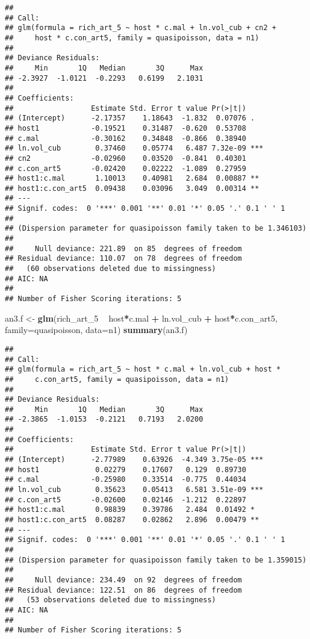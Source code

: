 \documentclass[]{article}
\newenvironment{Shaded}{\begin{snugshade}}{\end{snugshade}}
\newcommand{\KeywordTok}[1]{\textcolor[rgb]{0.13,0.29,0.53}{\textbf{#1}}}
\newcommand{\DataTypeTok}[1]{\textcolor[rgb]{0.13,0.29,0.53}{#1}}
\newcommand{\DecValTok}[1]{\textcolor[rgb]{0.00,0.00,0.81}{#1}}
\newcommand{\StringTok}[1]{\textcolor[rgb]{0.31,0.60,0.02}{#1}}
\newcommand{\OperatorTok}[1]{\textcolor[rgb]{0.81,0.36,0.00}{\textbf{#1}}}
\newcommand{\NormalTok}[1]{#1}
\begin{document}
\begin{verbatim}
## 
## Call:
## glm(formula = rich_art_5 ~ host * c.mal + ln.vol_cub + cn2 + 
##     host * c.con_art5, family = quasipoisson, data = n1)
## 
## Deviance Residuals: 
##     Min       1Q   Median       3Q      Max  
## -2.3927  -1.0121  -0.2293   0.6199   2.1031  
## 
## Coefficients:
##                  Estimate Std. Error t value Pr(>|t|)    
## (Intercept)      -2.17357    1.18643  -1.832  0.07076 .  
## host1            -0.19521    0.31487  -0.620  0.53708    
## c.mal            -0.30162    0.34848  -0.866  0.38940    
## ln.vol_cub        0.37460    0.05774   6.487 7.32e-09 ***
## cn2              -0.02960    0.03520  -0.841  0.40301    
## c.con_art5       -0.02420    0.02222  -1.089  0.27959    
## host1:c.mal       1.10013    0.40981   2.684  0.00887 ** 
## host1:c.con_art5  0.09438    0.03096   3.049  0.00314 ** 
## ---
## Signif. codes:  0 '***' 0.001 '**' 0.01 '*' 0.05 '.' 0.1 ' ' 1
## 
## (Dispersion parameter for quasipoisson family taken to be 1.346103)
## 
##     Null deviance: 221.89  on 85  degrees of freedom
## Residual deviance: 110.07  on 78  degrees of freedom
##   (60 observations deleted due to missingness)
## AIC: NA
## 
## Number of Fisher Scoring iterations: 5
\end{verbatim}

\begin{Shaded}
\begin{Highlighting}[]
\NormalTok{an3.f <-}\StringTok{ }\KeywordTok{glm}\NormalTok{(rich_art_}\DecValTok{5} \OperatorTok{~}\StringTok{ }\NormalTok{host}\OperatorTok{*}\NormalTok{c.mal }\OperatorTok{+}\StringTok{ }\NormalTok{ln.vol_cub }\OperatorTok{+}\StringTok{ }\NormalTok{host}\OperatorTok{*}\NormalTok{c.con_art5, }
           \DataTypeTok{family=}\NormalTok{quasipoisson, }\DataTypeTok{data=}\NormalTok{n1)}
\KeywordTok{summary}\NormalTok{(an3.f)}
\end{Highlighting}
\end{Shaded}

\begin{verbatim}
## 
## Call:
## glm(formula = rich_art_5 ~ host * c.mal + ln.vol_cub + host * 
##     c.con_art5, family = quasipoisson, data = n1)
## 
## Deviance Residuals: 
##     Min       1Q   Median       3Q      Max  
## -2.3865  -1.0153  -0.2121   0.7193   2.0200  
## 
## Coefficients:
##                  Estimate Std. Error t value Pr(>|t|)    
## (Intercept)      -2.77989    0.63926  -4.349 3.75e-05 ***
## host1             0.02279    0.17607   0.129  0.89730    
## c.mal            -0.25980    0.33514  -0.775  0.44034    
## ln.vol_cub        0.35623    0.05413   6.581 3.51e-09 ***
## c.con_art5       -0.02600    0.02146  -1.212  0.22897    
## host1:c.mal       0.98839    0.39786   2.484  0.01492 *  
## host1:c.con_art5  0.08287    0.02862   2.896  0.00479 ** 
## ---
## Signif. codes:  0 '***' 0.001 '**' 0.01 '*' 0.05 '.' 0.1 ' ' 1
## 
## (Dispersion parameter for quasipoisson family taken to be 1.359015)
## 
##     Null deviance: 234.49  on 92  degrees of freedom
## Residual deviance: 122.51  on 86  degrees of freedom
##   (53 observations deleted due to missingness)
## AIC: NA
## 
## Number of Fisher Scoring iterations: 5
\end{verbatim}
\end{document}
